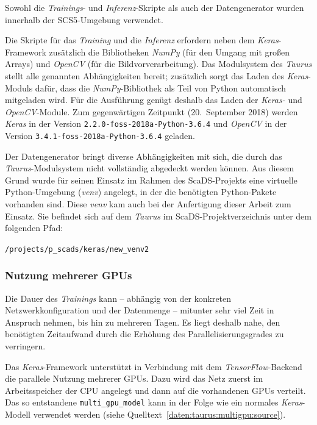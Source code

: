 Sowohl die \textit{Trainings}- und \textit{Inferenz}-Skripte als auch der Datengenerator wurden innerhalb der
SCS5-Umgebung verwendet.

Die Skripte für das \textit{Training} und die \textit{Inferenz} erfordern neben dem \textit{Keras}-Framework zusätzlich
die Bibliotheken \textit{NumPy} (für den Umgang mit großen Arrays) und \textit{OpenCV} (für die Bildvorverarbeitung).
Das Modulsystem des \textit{Taurus} stellt alle genannten Abhängigkeiten bereit; zusätzlich sorgt das Laden des
\textit{Keras}-Moduls dafür, dass die \textit{NumPy}-Bibliothek als Teil von Python automatisch mitgeladen wird. Für die
Ausführung genügt deshalb das Laden der \textit{Keras-} und \textit{OpenCV}-Module. Zum gegenwärtigen Zeitpunkt
(20.\ September 2018) werden \textit{Keras} in der Version \texttt{2.2.0-foss-2018a-Python-3.6.4} und \textit{OpenCV} in
der Version \texttt{3.4.1-foss-2018a-Python-3.6.4} geladen.

Der Datengenerator bringt diverse Abhängigkeiten mit sich, die durch das \textit{Taurus}-Modulsystem nicht vollständig
abgedeckt werden können. Aus diesem Grund wurde für seinen Einsatz im Rahmen des ScaDS-Projekts eine virtuelle
Python-Umgebung (\textit{venv}) angelegt, in der die benötigten Python-Pakete vorhanden sind. Diese \textit{venv} kam
auch bei der Anfertigung dieser Arbeit zum Einsatz. Sie befindet sich auf dem \textit{Taurus} im
ScaDS-Projektverzeichnis unter dem folgenden Pfad:

\texttt{/projects/p\_scads/keras/new\_venv2}

\subsubsection{Nutzung mehrerer GPUs}
\label{daten:taurus:multigpu}

Die Dauer des \textit{Trainings} kann -- abhängig von der konkreten Netzwerkkonfiguration und der Datenmenge -- mitunter
sehr viel Zeit in Anspruch nehmen, bis hin zu mehreren Tagen. Es liegt deshalb nahe, den benötigten Zeitaufwand durch
die Erhöhung des Parallelisierungsgrades zu verringern.

Das \textit{Keras}-Framework unterstützt in Verbindung mit dem \textit{TensorFlow}-Backend die parallele Nutzung
mehrerer GPUs. Dazu wird das Netz zuerst im Arbeitsspeicher der CPU angelegt und dann auf die vorhandenen GPUs verteilt.
Das so entstandene \texttt{multi\_gpu\_model} kann in der Folge wie ein normales \textit{Keras}-Modell verwendet werden
(siehe Quelltext~\ref{daten:taurus:multigpu:source}).

